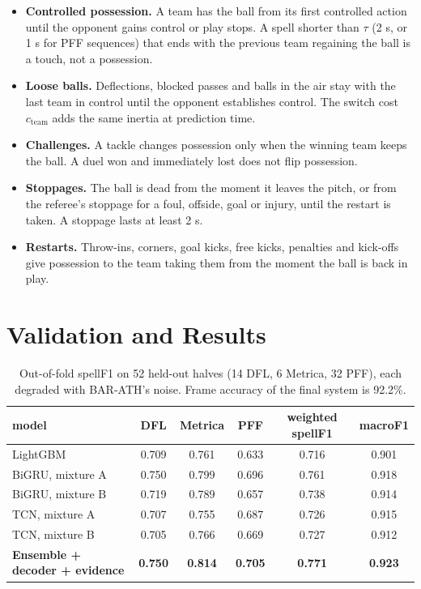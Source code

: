 \documentclass[10pt]{article}
\begin{document}
\begin{itemize}[leftmargin=1.2em]
\item \textbf{Controlled possession.} A team has the ball from its first controlled action until the opponent gains control or play stops. A spell shorter than $\tau$ (2 s, or 1 s for PFF sequences) that ends with the previous team regaining the ball is a touch, not a possession.
\item \textbf{Loose balls.} Deflections, blocked passes and balls in the air stay with the last team in control until the opponent establishes control. The switch cost $c_{\text{team}}$ adds the same inertia at prediction time.
\item \textbf{Challenges.} A tackle changes possession only when the winning team keeps the ball. A duel won and immediately lost does not flip possession.
\item \textbf{Stoppages.} The ball is dead from the moment it leaves the pitch, or from the referee's stoppage for a foul, offside, goal or injury, until the restart is taken. A stoppage lasts at least 2 s.
\item \textbf{Restarts.} Throw-ins, corners, goal kicks, free kicks, penalties and kick-offs give possession to the team taking them from the moment the ball is back in play.
\end{itemize}

\section*{Validation and Results}
\begin{table}[H]
\centering\small
\begin{tabular}{@{}lccccc@{}}
\toprule
model & DFL & Metrica & PFF & weighted spellF1 & macroF1 \\
\midrule
LightGBM & 0.709 & 0.761 & 0.633 & 0.716 & 0.901 \\
BiGRU, mixture A & 0.750 & 0.799 & 0.696 & 0.761 & 0.918 \\
BiGRU, mixture B & 0.719 & 0.789 & 0.657 & 0.738 & 0.914 \\
TCN, mixture A & 0.707 & 0.755 & 0.687 & 0.726 & 0.915 \\
TCN, mixture B & 0.705 & 0.766 & 0.669 & 0.727 & 0.912 \\
\midrule
\textbf{Ensemble + decoder + evidence} & \textbf{0.750} & \textbf{0.814} & \textbf{0.705} & \textbf{0.771} & \textbf{0.923} \\
\bottomrule
\end{tabular}
\caption{Out-of-fold spellF1 on 52 held-out halves (14 DFL, 6 Metrica, 32 PFF), each degraded with BAR-ATH's noise. Frame accuracy of the final system is 92.2\%.}
\end{table}
\end{document}
